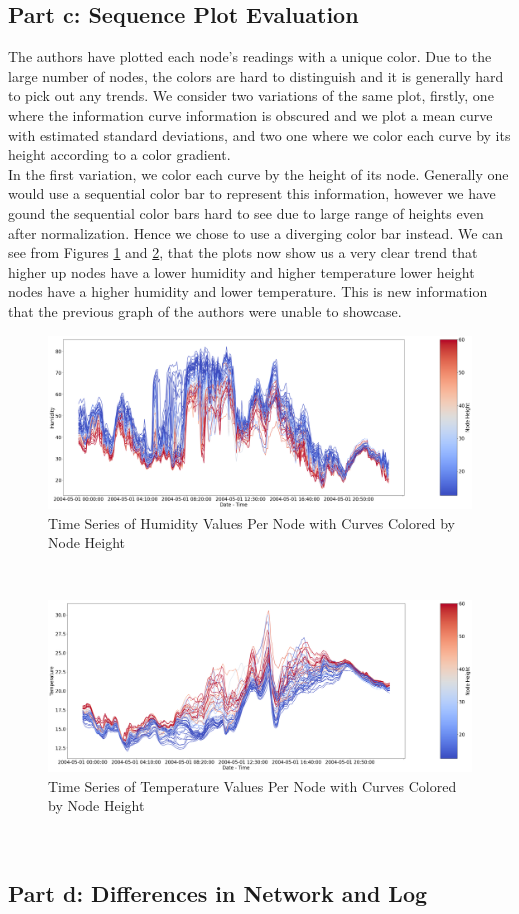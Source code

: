 \documentclass[11pt, letterpaper]{article}
\begin{document}
\subsection{Part c: Sequence Plot Evaluation}
The authors have plotted each node's readings with a unique color. Due to the large number of nodes, the colors are hard to distinguish and it is generally hard to pick out any trends. We consider two variations of the same plot, firstly, one where the information curve information is obscured and we plot a mean curve with estimated standard deviations, and two one where we color each curve by its height according to a color gradient.
\\
In the first variation, we color each curve by the height of its node. Generally one would use a sequential color bar to represent this information, however we have gound the sequential color bars hard to see due to large range of heights even after normalization. Hence we chose to use a diverging color bar instead. We can see from Figures \ref{fig:graph_crtique_c1} and \ref{fig:graph_crtique_c2}, that the plots now show us a very clear trend that higher up nodes have a lower humidity and higher temperature lower height nodes have a higher humidity and lower temperature.  This is new information that the previous graph of the authors were unable to showcase.
\begin{figure}[h!]
\centering
\includegraphics[width=1.0\textwidth]{Report Images/fig8_graph_critique_c1.png}
\caption{Time Series of Humidity Values Per Node with Curves Colored by Node Height}
\label{fig:graph_crtique_c1}
\end{figure}
\\
\begin{figure}[h!]
\centering
\includegraphics[width=1.0\textwidth]{Report Images/fig8_graph_critique_c2.png}
\caption{Time Series of Temperature Values Per Node with Curves Colored by Node Height}
\label{fig:graph_crtique_c2}
\end{figure}
\\

\subsection{Part d: Differences in Network and Log}
\end{document}
